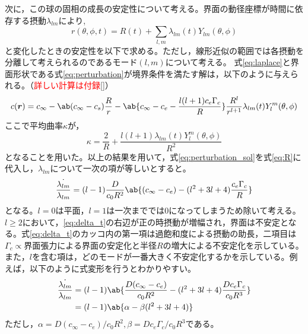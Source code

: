 \documentclass[autodetect-engine,dvi=dvipdfmx,a4paper,ja=standard,oneside,openany,11pt,draft]{bxjsbook}
\begin{document}
次に，この球の固相の成長の安定性について考える。界面の動径座標が時間に依存する摂動$\lambda_{lm}$により,
\begin{equation}
  r(\theta,\phi,t) = R(t) + \sum_{l,m} \lambda_{lm}(t)Y_{lm}(\theta,\phi)
  \label{eq:perturbation}
\end{equation}
と変化したときの安定性を以下で求める。ただし，線形近似の範囲では各摂動を分離して考えられるのであるモード$(l,m)$について考える。
式\eqref{eq:laplace}と界面形状である式\eqref{eq:perturbation}が境界条件を満たす解は，以下のように与えられる。（\textcolor{red}{詳しい計算は付録\ref{}}）
\begin{equation}
  \begin{split}
    c(\bm{r})=c_{\infty}-\ab(c_{\infty}-c_s)\frac{R}{r}-\ab\{c_\infty-c_e-\frac{l(l+1)c_e\Gamma_c}{R}\}\frac{R^l}{r^{l+1}}\lambda_{lm}(t)Y_{l}^{m}(\theta,\phi)
  \end{split}
  \label{eq:perturbation_sol}
\end{equation}
ここで平均曲率$\kappa$が，
\begin{equation}
  \kappa = \frac{2}{R}+\frac{l(l+1)\lambda_{lm}(t)Y_l^m(\theta,\phi)}{R^2}
  \label{eq:perturbation_curvature}
\end{equation}
となることを用いた。以上の結果を用いて，式\eqref{eq:perturbation_sol}を式\eqref{eq:R}に代入し，$\lambda_{lm}$について一次の項が等しいとすると。
\begin{equation}
  \frac{\dot{\lambda_{lm}}}{\lambda_{lm}} =(l-1)\frac{D}{c_0R^2}\ab\{(c_\infty-c_e)-(l^2+3l+4)\frac{c_e\Gamma_c}{R}\}
  \label{eq:delta_t}
\end{equation}
となる。$l=0$は平面，$l=1$は一次まででは0になってしまうため除いて考える。$l\geq2$において，\eqref{eq:delta_t}の右辺が正の時摂動が増幅され，界面は不安定となる。式\eqref{eq:delta_t}のカッコ内の第一項は過飽和度による摂動の助長，二項目は$\Gamma_c\propto$界面張力による界面の安定化と半径$R$の増大による不安定化を示している。また，$l$を含む項は，どのモードが一番大きく不安定化するかを示している。例えば，以下のように式変形を行うとわかりやすい。
\begin{equation}
  \begin{split}
    \frac{\dot{\lambda_{lm}}}{\lambda_{lm}} & =(l-1)\ab\{\frac{D(c_\infty-c_e)}{c_0R^2}-(l^2+3l+4)\frac{D c_e\Gamma_c}{c_0 R^3}\} \\
                                            & =(l-1)\ab\{\alpha-\beta(l^2+3l+4)\}
  \end{split}
  \label{eq:delta_t_simple}
\end{equation}
ただし，$\alpha=D(c_\infty-c_e)/c_0R^2,\beta=D c_e\Gamma_c/c_0 R^3$である。
\end{document}
